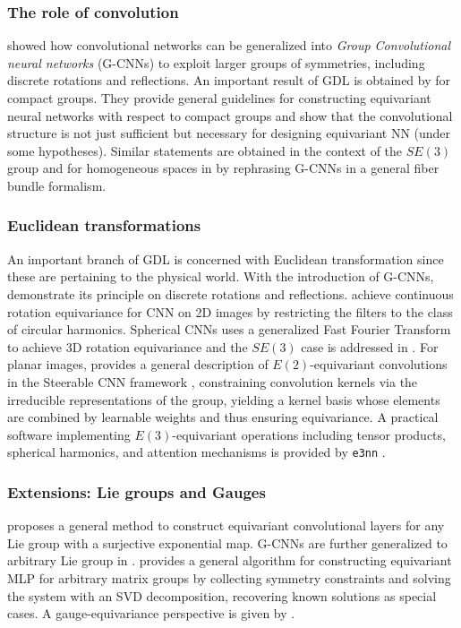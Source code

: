 \documentclass[mathematics,review,submit,moreauthors]{Definitions/mdpi}
\begin{document}
\subsubsection{The role of convolution}
\cite{cohen2016} showed how convolutional networks can be generalized into \textit{Group Convolutional neural networks} (G-CNNs) to exploit larger groups of symmetries, including discrete rotations and reflections.
An important result of GDL is obtained by \cite{kondor2018p3icml} for compact groups.
They provide general guidelines for constructing equivariant neural networks with respect to compact groups and show that the convolutional structure is not just sufficient but necessary for designing equivariant NN (under some hypotheses).
Similar statements are obtained in the context of the $SE(3)$ group\cite{weiler2018anips} and for homogeneous spaces in \cite{cohen2019anips} by rephrasing G-CNNs in a general fiber bundle formalism.

\subsubsection{Euclidean transformations}
An important branch of GDL is concerned with Euclidean transformation since these are pertaining to the physical world.
With the introduction of G-CNNs, \cite{cohen2016} demonstrate its principle on discrete rotations and reflections.
\citet{worrall2017} achieve continuous rotation equivariance for CNN on 2D images by restricting the filters to the class of circular harmonics.
Spherical CNNs \cite{cohen2018} uses a generalized Fast Fourier Transform to achieve $3$D rotation equivariance and the $SE(3)$ case is addressed in \cite{weiler2018anips}.
For planar images, \cite{weiler2019anips} provides a general description of $E(2)$-equivariant convolutions in the Steerable CNN framework \cite{cohen2016a}, constraining convolution kernels via the irreducible representations of the group, yielding a kernel basis whose elements are combined by learnable weights and thus ensuring equivariance.
A practical software implementing $E(3)$-equivariant operations including tensor products, spherical harmonics, and attention mechanisms is provided by \texttt{e3nn} \cite{geiger2022}.

\subsubsection{Extensions: Lie groups and Gauges}
\cite{finzi2020p3icml} proposes a general method to construct equivariant convolutional layers for any Lie group with a surjective exponential map.
G-CNNs are further generalized to arbitrary Lie group in \cite{bekkers2021}.
\cite{finzi2021p3icml} provides a general algorithm for constructing equivariant MLP for arbitrary matrix groups by collecting symmetry constraints and solving the system with an SVD decomposition, recovering known solutions as special cases.
A gauge-equivariance perspective is given by \cite{cohen2019p3icml,gerken2021,weiler2026,boyda2021prd}.
\end{document}
